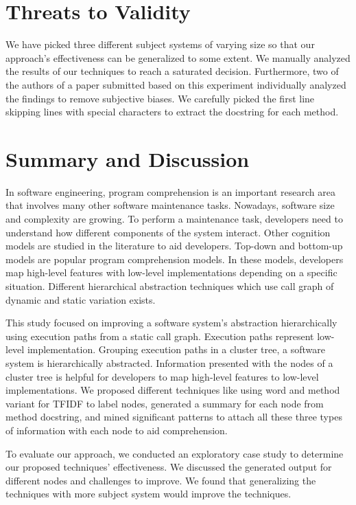 \section{Threats to Validity}

We have picked three different subject systems of varying size so that our approach's effectiveness can be generalized to some extent. We manually analyzed the results of our techniques to reach a saturated decision. Furthermore, two of the authors of a paper submitted based on this experiment individually analyzed the findings to remove subjective biases. We carefully picked the first line skipping lines with special characters to extract the docstring for each method. 

\section{Summary and Discussion}
In software engineering, program comprehension is an important research area that involves many other software maintenance tasks. Nowadays, software size and complexity are growing. To perform a maintenance task, developers need to understand how different components of the system interact. Other cognition models are studied in the literature to aid developers. Top-down and bottom-up models are popular program comprehension models. In these models, developers map high-level features with low-level implementations depending on a specific situation. Different hierarchical abstraction techniques which use call graph of dynamic and static variation exists. 

This study focused on improving a software system's abstraction hierarchically using execution paths from a static call graph. Execution paths represent low-level implementation. Grouping execution paths in a cluster tree, a software system is hierarchically abstracted. Information presented with the nodes of a cluster tree is helpful for developers to map high-level features to low-level implementations. We proposed different techniques like using word and method variant for TFIDF to label nodes, generated a summary for each node from method docstring, and mined significant patterns to attach all these three types of information with each node to aid comprehension.

To evaluate our approach, we conducted an exploratory case study to determine our proposed techniques' effectiveness. We discussed the generated output for different nodes and challenges to improve. We found that generalizing the techniques with more subject system would improve the techniques. 
